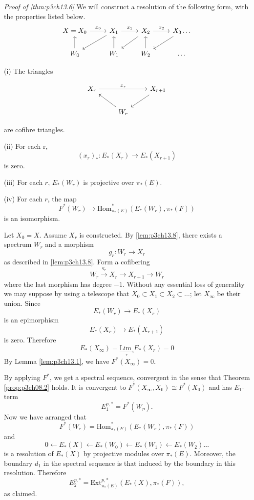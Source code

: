 \documentclass[../main]{subfiles}
\begin{document}
\emph{Proof of \ref{thm:p3ch13.6}} We will construct a resolution of the following form, with the properties listed below.
\[\begin{tikzcd}
	{X=X_0} & {X_1} & {X_2} & {X_3 \dots} \\
	{W_0} & {W_1} & {W_2} & \dots
	\arrow["{x_1}", from=1-2, to=1-3]
	\arrow["{x_2}", from=1-3, to=1-4]
	\arrow[from=1-4, to=2-3]
	\arrow[from=2-3, to=1-3]
	\arrow[from=1-3, to=2-2]
	\arrow[from=2-2, to=1-2]
	\arrow["{x_0}", from=1-1, to=1-2]
	\arrow[from=1-2, to=2-1]
	\arrow[from=2-1, to=1-1]
\end{tikzcd}\]

(i) The triangles

\[\begin{tikzcd}
	{X_r} & {} & {X_{r+1}} \\
	& {W_r} & {}
	\arrow["{x_r}", from=1-1, to=1-3]
	\arrow[from=1-3, to=2-2]
	\arrow[from=2-2, to=1-1]
\end{tikzcd}\]

are cofibre triangles.

(ii) For each r,
\[(x_r)_\ast \colon E_\ast(X_r) \longrightarrow E_\ast(X_{r+1})\]
is zero.

(iii) For each $r$, $E_\ast(W_r)$ is projective over $\pi_\ast(E)$.

(iv) For each $r$, the map
\[F^\ast(W_r) \longrightarrow \text{Hom}^\ast_{\pi_\ast(E)}(E_\ast(W_r), \pi_\ast(F))\]
is an isomorphism.

Let $X_0 = X$. Assume $X_r$ is constructed. By \ref{lem:p3ch13.8}, there exists a spectrum $W_r$ and a morphism
\[g_r \colon W_r \longrightarrow X_r\]
as described in \ref{lem:p3ch13.8}. Form a cofibering
\[W_r\overset{g_r}{\longrightarrow} X_r \longrightarrow X_{r+1} \longrightarrow W_r\]
where the last morphism has degree $-1$. Without any essential loss of generality we may suppose by using a telescope that $X_0 \subset X_1 \subset X_2 \subset \dots$; let $X_\infty$ be their union. Since
\[E_\ast(W_r) \longrightarrow E_\ast(X_r)\]
is an epimorphism
\[E_\ast(X_r) \longrightarrow E_\ast(X_{r+1})\]
is zero. Therefore
\[E_\ast(X_\infty) = \underset{\underset{r}{\longrightarrow}}{\text{Lim }} E_\ast(X_r) = 0\]
By Lemma \ref{lem:p3ch13.1}, we have $F^\ast(X_\infty) = 0$.

By applying $F^\ast$, we get a spectral sequence, convergent in the sense that Theorem \ref{prop:p3ch08.2} holds. It is convergent to $F^\ast(X_\infty, X_0) \cong F^\ast(X_0)$ and has $E_1$-term
\[E^{p, \ast}_1 = F^\ast(W_p).\]
Now we have arranged that
\[F^\ast(W_r) = \text{Hom}^\ast_{\pi_\ast(E)}(E_\ast(W_r), \pi_\ast(F))\]
and
\[0 \longleftarrow E_\ast(X) \longleftarrow E_\ast(W_0) \longleftarrow E_\ast(W_1) \longleftarrow E_\ast(W_2) \dots\]
is a resolution of $E_\ast(X)$ by projective modules over $\pi_\ast(E)$. Moreover, the boundary $d_1$ in the spectral sequence is that induced by the boundary in this resolution. Therefore
\[E_2^{p, \ast} = \text{Ext}^{p, \ast}_{\pi_\ast(E)}(E_\ast(X), \pi_\ast(F)),\]
as claimed.
\end{document}
